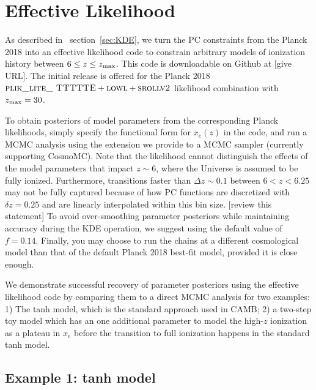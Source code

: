 \documentclass[prd,twocolumn,amsmath,amssymb,floatfix,superscriptaddress,nofootinbib]{revtex4-1}
\newcommand{\refsec}[1]{section~\ref{sec:#1}}
\newcommand{\zmax}{z_{\rm max}}
\begin{document}



\section{Effective Likelihood}
\label{sec:effective_likelihood}

As described in ~\refsec{KDE}, we turn the PC constraints from the Planck 2018 into an effective likelihood code to constrain arbitrary models of ionization history between $6 \leq z \leq \zmax$. This code is downloadable on Github at \url{} [give URL]. The initial release is offered for the Planck 2018 $\textsc{plik\_lite\_ TTTTTE} + \textsc{lowl} + \textsc{srollv2}$ likelihood combination with $\zmax = 30$. 

To obtain posteriors of model parameters from the corresponding Planck likelihoods, simply specify the functional form for $x_e(z)$ in the code, and run a MCMC analysis using the extension we provide to a MCMC sampler (currently supporting CosmoMC). Note that the likelihood cannot distinguish the effects of the model parameters that impact $z \sim 6$, where the Universe is assumed to be fully ionized. Furthermore, transitions faster than $\Delta z \sim 0.1$ between $6 < z < 6.25$ may not be fully captured because of how PC functions are discretized with $\delta z = 0.25$ and are linearly interpolated within this bin size. [review this statement] To avoid over-smoothing parameter posteriors while maintaining accuracy during the KDE operation, we suggest using the default value of $f = 0.14$. Finally, you may choose to run the chains at a different cosmological model than that of the default Planck 2018 best-fit model, provided it is close enough. 

We demonstrate successful recovery of parameter posteriors using the effective likelihood code by comparing them to a direct MCMC analysis for two examples: 1) The tanh model, which is the standard approach used in CAMB; 2) a two-step toy model which has an one additional parameter to model the high-$z$ ionization as a plateau in $x_e$ before the transition to full ionization happens in the standard tanh model.

\subsection{Example 1: tanh model}
\label{sec:example1}
\end{document}
